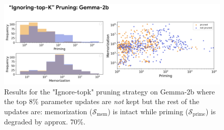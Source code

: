 \documentclass[11pt, a4paper, logo, copyright]{googledeepmind}
\theoremstyle{plain}
\theoremstyle{definition}
\theoremstyle{remark}
\begin{document}
\begin{figure}[h]
\vspace{0mm}
    \centering \includegraphics[scale=.38,clip]{figures/pruning_gemma.png}
    \vspace{-1mm}
    \caption{Results for the "Ignore-topk" pruning strategy on Gemma-2b where the top $8\%$ parameter updates are \textit{not} kept but the rest of the updates are: memorization ($\mathcal{S}_\text{mem}$) is intact while priming ($\mathcal{S}_\text{prime}$) is degraded by approx. 70\%.} \label{fig:pruning_gemma}
  \vspace{-0mm}
\end{figure}
\end{document}
